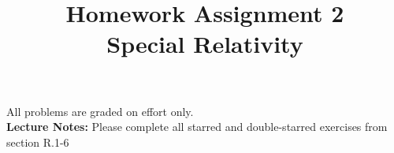 \documentclass[12pt]{article}
\begin{document}
\date{\vspace{-5ex}}

\title{Homework Assignment 2 \\ Special Relativity}

\maketitle

\noindent
All problems are graded on effort only.\\

\noindent
{\bf Lecture Notes:}  Please complete all starred and double-starred exercises from section R.1-6\\
\end{document}
